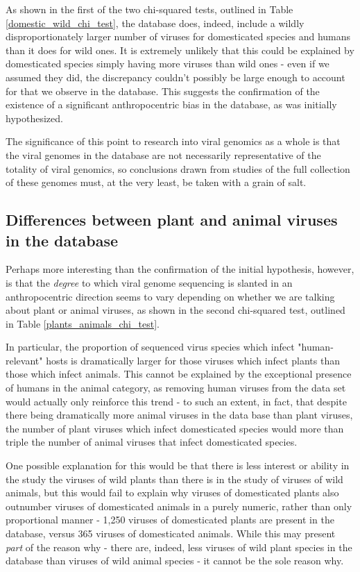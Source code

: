 \documentclass[12pt]{article}
\begin{document}
    As shown in the first of the two chi-squared tests, outlined in Table
    \ref{domestic_wild_chi_test}, the database does, indeed, include a wildly
    disproportionately larger number of viruses for domesticated species and
    humans than it does for wild ones. It is extremely unlikely that this could
    be explained by domesticated species simply having more viruses than wild
    ones - even if we assumed they did, the discrepancy couldn't possibly be
    large enough to account for that we observe in the database. This suggests
    the confirmation of the existence of a significant anthropocentric bias
    in the database, as was initially hypothesized.

    The significance of this point to research into viral genomics as a whole is
    that the viral genomes in the database are not necessarily representative of
    the totality of viral genomics, so conclusions drawn from studies of the full
    collection of these genomes must, at the very least, be taken with a grain of
    salt.

    \subsection{Differences between plant and animal viruses in the database}

    Perhaps more interesting than the confirmation of the initial hypothesis,
    however, is that the \emph{degree} to which viral genome sequencing is slanted in
    an anthropocentric direction seems to vary depending on whether we are
    talking about plant or animal viruses, as shown in the second chi-squared
    test, outlined in Table \ref{plants_animals_chi_test}.

    In particular, the proportion of sequenced virus species which infect 
    "human-relevant" hosts is dramatically larger for those viruses which infect
    plants than those which infect animals. This cannot be explained by the
    exceptional presence of humans in the animal category, as removing
    human viruses from the data set would actually only reinforce this trend
    - to such an extent, in fact, that despite there being dramatically more
    animal viruses in the data base than plant viruses, the number of plant
    viruses which infect domesticated species would more than triple the number
    of animal viruses that infect domesticated species.

    One possible explanation for this would be that there is less interest or
    ability in the study the viruses of wild plants than there is in the study
    of viruses of wild animals, but this would fail to explain why viruses
    of domesticated plants also outnumber viruses of domesticated animals in a
    purely numeric, rather than only proportional manner - 1,250 viruses of
    domesticated plants are present in the database, versus 365 viruses of
    domesticated animals. While this may present \emph{part} of the reason
    why - there are, indeed, less viruses of wild plant species in the database
    than viruses of wild animal species - it cannot be the sole reason why.
\end{document}
